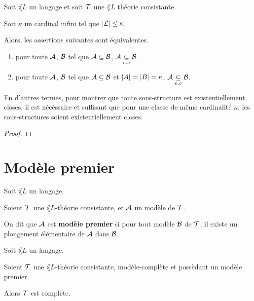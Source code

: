 \documentclass[a4paper, 12pt]{report}
\begin{document}
\begin{lemma}
	Soit $\lang{L}$ un langage et soit $\mathcal{T}$ une $\lang{L}$ théorie consistante.

	Soit $\kappa$ un cardinal infini tel que $|\mathcal{L}| \leq \kappa$.

	Alors, les assertions suivantes sont équivalentes.

	\begin{enumerate}
		\item pour toute $\mathcal{A}$, $\mathcal{B}$ tel que $\mathcal{A}
			\subseteq \mathcal{B}$, $\mathcal{A} \underset{e.c}{\subseteq}
			\mathcal{B}$.
		\item pour toute $\mathcal{A}$, $\mathcal{B}$ tel que $\mathcal{A}
			\subseteq \mathcal{B}$ et $|A| = |B| = \kappa$, $\mathcal{A} \underset{e.c}{\subseteq}
			\mathcal{B}$.
	\end{enumerate}

	En d'autres termes, pour montrer que toute sous-structure est
	existentiellement closes, il est nécéssaire et suffisant que pour une classe
	de même cardinalité $\kappa$, les sous-structures soient existentiellement
	closes.
\end{lemma}

\ifdefined\outputproof
\begin{proof}

\end{proof}
\fi

\chapter{Modèle premier}

\begin{definition}
	Soit $\lang{L}$ un langage.

	Soient $\mathcal{T}$ une $\lang{L}$-théorie consistante, et $\mathcal{A}$ un
	modèle de $\mathcal{T}$.

	On dit que $\mathcal{A}$ est \textbf{modèle premier} si pour tout modèle
	$\mathcal{B}$ de $\mathcal{T}$, il existe un plongement élémentaire de
	$\mathcal{A}$ dans $\mathcal{B}$.
\end{definition}

\begin{proposition}
	Soit $\lang{L}$ un langage.

	Soient $\mathcal{T}$ une $\lang{L}$-théorie consistante, modèle-complète et
	possèdant un modèle premier.

	Alors $\mathcal{T}$ est complète.
\end{proposition}
\end{document}
